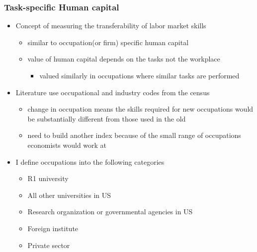 \documentclass[11pt]{beamer}
\begin{document}
\begin{frame}
	\frametitle{Task-specific Human capital}
	\begin{itemize}
		\item Concept of measuring the transferability of labor market skills
		\begin{itemize}
			\item similar to occupation(or firm) specific human capital
			\item value of human capital depends on the tasks not the workplace
			\begin{itemize}
				\item valued similarly in occupations where similar tasks are performed
			\end{itemize}
		
		\end{itemize}
		\vspace{1 mm}
	\item Literature use occupational and industry codes from the census
	\begin{itemize}
		\item change in occupation means the skills required for new occupations would be substantially different from those used in the old 
		\item need to build another index because of the small range of occupations economists would work at
	\end{itemize}
		\vspace{1 mm}
	\item I define occupations into the following categories
	\begin{itemize}
		\item R1 university
		\item All other universities in US
		\item Research organization or governmental agencies in US
		\item Foreign institute
		\item Private sector
	\end{itemize}
	\end{itemize}
\end{frame}
\end{document}
